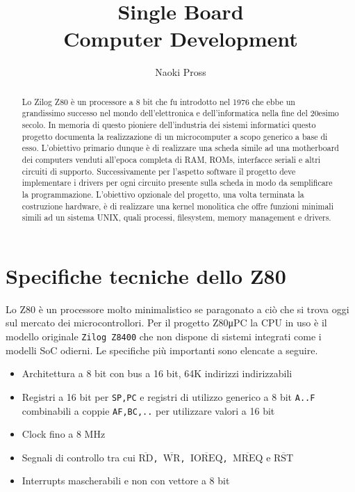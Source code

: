 \documentclass[a4paper, 11pt, twoside]{article}
\title{\vspace{-1cm}\texttt{\prj} Single Board \\ Computer Development }
\author{Naoki Pross}
\newcommand{\prj}{Z80μPC\xspace}
\newcommand{\inv}[1]{$\overline{\mbox{#1}}$}
\begin{document}
\maketitle
\begin{abstract}

    Lo Zilog Z80 \`e un processore a 8 bit che fu introdotto nel 1976 che ebbe
    un grandissimo successo nel mondo dell'elettronica e dell'informatica
    nella fine del 20esimo secolo. In memoria di questo pioniere
    dell'industria dei sistemi informatici questo progetto documenta la
    realizzazione di un microcomputer a scopo generico a base di esso.
    L'obiettivo primario dunque \`e di realizzare una scheda simile ad una
    motherboard dei computers venduti all'epoca completa di RAM, ROMs,
    interfacce seriali e altri circuiti di supporto. Successivamente per
    l'aspetto software il progetto deve implementare i drivers per ogni
    circuito presente sulla scheda in modo da semplificare la programmazione. 
    L'obiettivo opzionale del progetto, una volta terminata la costruzione
    hardware, \`e di realizzare una kernel monolitica che offre funzioni
    minimali simili ad un sistema UNIX, quali processi, filesystem, memory
    management e drivers.

\end{abstract}

\section{Specifiche tecniche dello Z80}
Lo Z80 \`e un processore molto minimalistico se paragonato a ci\`o che si
trova oggi sul mercato dei microcontrollori. Per il progetto \prj la CPU in
uso \`e il modello originale \texttt{Zilog Z8400} che non dispone di sistemi
integrati come i modelli SoC odierni. Le specifiche pi\`u importanti sono
elencate a seguire.

\begin{itemize}
    \item Architettura a 8 bit con bus a 16 bit, 64K indirizzi indirizzabili
    \item Registri a 16 bit per {\tt SP,PC} e registri di utilizzo generico a
        8 bit {\tt A..F} combinabili a coppie {\tt AF,BC,..} per utilizzare
        valori a 16 bit
    \item Clock fino a 8 MHz
    \item Segnali di controllo tra cui \texttt{\inv{RD}, \inv{WR},
        \inv{IOREQ}, \inv{MREQ}} e \texttt{\inv{RST}}
    \item Interrupts mascherabili e non con vettore a 8 bit
\end{itemize}
\end{document}
